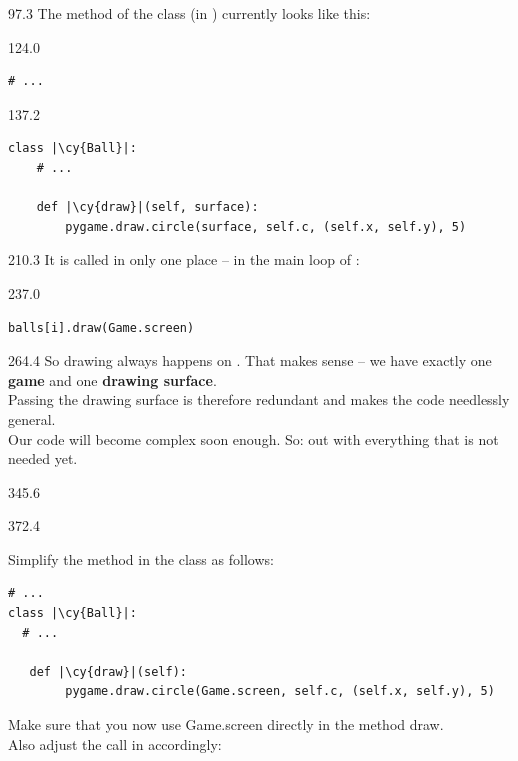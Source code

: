 \documentclass{aslab}
\newcommand*\cy[1]{\textcolor{codecyan}{#1}}
\begin{document}
\begin{region}{97.3}
The method  of the class  (in ) currently
looks like this:
\end{region}

\begin{region}{124.0}
\begin{lstlisting}[style=py]
# ...
\end{lstlisting}
\end{region}

\begin{region}{137.2}
\begin{lstlisting}[style=py]
class |\cy{Ball}|:
    # ...

    def |\cy{draw}|(self, surface):
        pygame.draw.circle(surface, self.c, (self.x, self.y), 5)
\end{lstlisting}
\end{region}

\begin{region}{210.3}
It is called in only one place -- in the main loop of :
\end{region}

\begin{region}{237.0}
\begin{lstlisting}[style=py]
    balls[i].draw(Game.screen)
\end{lstlisting}
\end{region}

\begin{region}[pitch=13.5]{264.4}
So drawing always happens on . That makes sense -- we have
exactly one \textbf{game} and one \textbf{drawing surface}.\\
Passing the drawing surface is therefore redundant and makes the code
needlessly general.\\
Our code will become complex soon enough. So: out with everything that is not
needed yet.
\end{region}

\begin{region}{345.6}
\end{region}

\begin{region}[pitch=13.3]{372.4}
\begin{ntasks}
\item Simplify the method  in the class  as follows:
\begin{lstlisting}[style=py]
# ...
class |\cy{Ball}|:
  # ...

   def |\cy{draw}|(self):
        pygame.draw.circle(Game.screen, self.c, (self.x, self.y), 5)
\end{lstlisting}
  \blank
  Make sure that you now use Game.screen directly in the method draw.\\
  Also adjust the call in  accordingly:
\end{ntasks}
\end{region}
\end{document}
